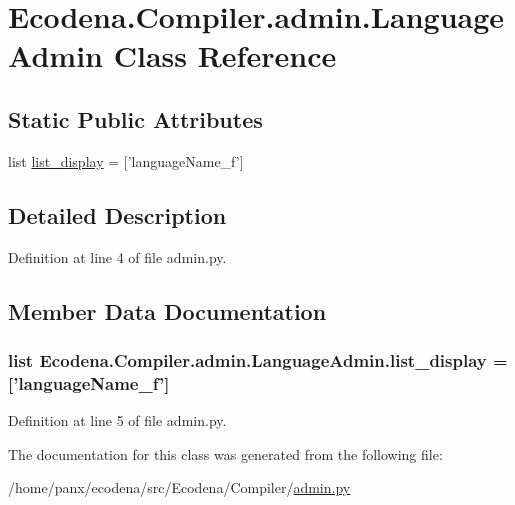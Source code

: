 \hypertarget{class_ecodena_1_1_compiler_1_1admin_1_1_language_admin}{
\section{Ecodena.Compiler.admin.LanguageAdmin Class Reference}
\label{d3/de1/class_ecodena_1_1_compiler_1_1admin_1_1_language_admin}
}
\subsection*{Static Public Attributes}
\begin{DoxyCompactItemize}
\item 
list \hyperlink{class_ecodena_1_1_compiler_1_1admin_1_1_language_admin_a2275c63ac91ec5b4544fc265ae6fa65f}{list\_\-display} = \mbox{[}'languageName\_\-f'\mbox{]}
\end{DoxyCompactItemize}


\subsection{Detailed Description}


Definition at line 4 of file admin.py.



\subsection{Member Data Documentation}
\hypertarget{class_ecodena_1_1_compiler_1_1admin_1_1_language_admin_a2275c63ac91ec5b4544fc265ae6fa65f}{
\subsubsection[{list\_\-display}]{\setlength{\rightskip}{0pt plus 5cm}list {\bf Ecodena.Compiler.admin.LanguageAdmin.list\_\-display} = \mbox{[}'languageName\_\-f'\mbox{]}}}
\label{d3/de1/class_ecodena_1_1_compiler_1_1admin_1_1_language_admin_a2275c63ac91ec5b4544fc265ae6fa65f}


Definition at line 5 of file admin.py.



The documentation for this class was generated from the following file:\begin{DoxyCompactItemize}
\item 
/home/panx/ecodena/src/Ecodena/Compiler/\hyperlink{_compiler_2admin_8py}{admin.py}\end{DoxyCompactItemize}
